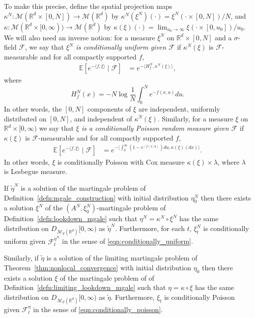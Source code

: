 \documentclass[EJP]{ejpecp} %
\renewcommand{\tilde}{\widetilde}
\newcommand{\IE}{\mathbb E}
\newcommand{\IR}{\mathbb R}
\newcommand{\lp}{\xi}              %
\newcommand{\measures}{\mathcal{M}_F(\IR^d)} %
\begin{document}
To make this precise,
define the spatial projection maps
$\kappa^N: \mathcal{M}(\IR^d \times [0, N]) \to \mathcal{M}(\IR^d)$
by $\kappa^N(\xi^N)(\cdot) = \xi^N(\cdot \times [0, N]) / N$,
and $\kappa: \mathcal{M}(\IR^d \times [0, \infty)) \to \mathcal{M}(\IR^d)$
by $\kappa(\xi)(\cdot) = \lim_{u_0 \to \infty} \xi(\cdot \times [0, u_0]) / u_0$.
We will also need an inverse notion:
for a measure $\lp^N$ on $\IR^d \times [0, N]$ and a $\sigma$-field $\mathcal{F}$,
we say that \emph{$\lp^N$ is conditionally uniform given $\mathcal{F}$}
if $\kappa^N(\lp)$ is $\mathcal{F}$-measurable and 
for all compactly supported $f$,
\begin{align} \label{eqn:conditionally_uniform}
    \IE[ e^{-\langle f, \lp \rangle} \;|\; \mathcal{F} ]
    &=
    e^{-\langle H_f^N, \kappa^N(\lp) \rangle} ,
\end{align}
where
$$ H_f^N(x) = - N \log \frac{1}{N} \int_0^N e^{-f(x, u)} du . $$
In other words, the $[0, N]$ components of $\lp$
are independent, uniformly distributed on $[0, N]$, and independent of 
$\kappa^N(\lp)$.
Similarly, for a measure $\lp$ on $\IR^d \times [0, \infty)$
we say that \emph{$\lp$ is a conditionally Poisson random measure given $\mathcal{F}$}
if $\kappa(\lp)$ is $\mathcal{F}$-measurable and 
for all compactly supported $f$,
\begin{align} \label{eqn:conditionally_poisson}
    \IE[ e^{-\langle f, \lp \rangle} \;|\; \mathcal{F} ]
    &=
    e^{-\langle \int_0^\infty (1 - e^{-f(x, u)}) du, \kappa(\lp)(dx) \rangle} .
\end{align}
In other words, $\lp$ is conditionally Poisson with Cox measure $\kappa(\lp) \times \lambda$,
where $\lambda$ is Lesbegue measure.

\begin{proposition}
    \label{thm:mmt_application}
    If $\tilde \eta^N$ is a solution
    of the martingale problem of Definition~\ref{defn:mgale_construction}
    with initial distribution $\eta^N_0$
    then there exists a solution $\lp^N$
    of the $(A^N, \lp^N_0)$-martingale problem of Definition~\ref{defn:lookdown_mgale}
    such that $\eta^N = \kappa^N \circ \lp^N$
    has the same distribution on $D_{\measures}[0, \infty)$
    as $\tilde \eta^N$.
    Furthermore, for each $t$, $\lp^N_t$ is conditionally uniform 
	given $\mathcal{F}^{\eta^N}_t$
    in the sense of \eqref{eqn:conditionally_uniform}.

    Similarly,
    if $\tilde \eta$ is a solution
    of the limiting martingale problem of Theorem~\ref{thm:nonlocal_convergence}
    with initial distribution $\eta_0$
    then there exists a solution $\lp$
    of the martingale problem of of Definition~\ref{defn:limiting_lookdown_mgale}
    such that $\eta = \kappa \circ \lp$
    has the same distribution on $D_{\measures}[0, \infty)$
    as $\tilde \eta$.
    Furthermore, $\lp_t$ is conditionally Poisson given $\mathcal{F}^{\eta}_t$
    in the sense of \eqref{eqn:conditionally_poisson}.
\end{proposition}
\end{document}
